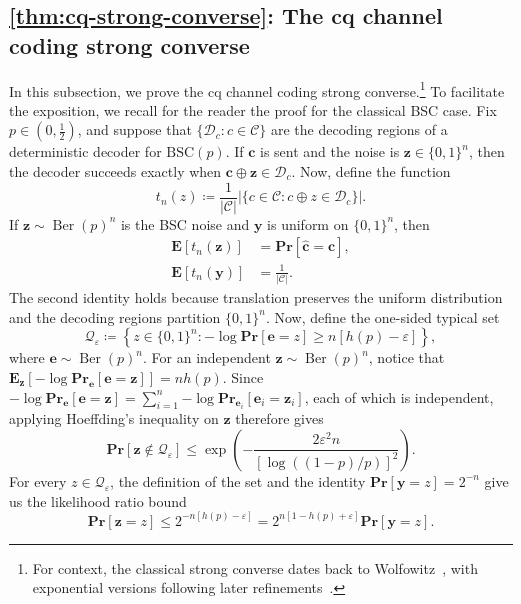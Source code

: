 \documentclass[11pt]{article}
\renewcommand{\leq}{\leqslant}
\renewcommand{\geq}{\geqslant}
\theoremstyle{remark}
\newcommand{\cC}{\mathcal{C}}
\newcommand{\cD}{\mathcal{D}}
\newcommand{\Ber}{\operatorname{Ber}}
\newcommand{\Eb}{\mathbf{E}}
\newcommand{\Prb}{\mathbf{Pr}}
\newcommand{\bits}{\{0,1\}}
\newcommand{\bchat}{\hat{\mathbf{c}}}
\newcommand{\bc}{\mathbf{c}}
\newcommand{\be}{\mathbf{e}}
\newcommand{\by}{\mathbf{y}}
\newcommand{\bz}{\mathbf{z}}
\newcommand{\eps}{\varepsilon}
\newcommand{\abs}[1]{\left|#1\right|}
\newcommand{\BSC}{\mathrm{BSC}}
\begin{document}
\subsection{\texorpdfstring{\cref{thm:cq-strong-converse}}{Theorem }: The cq channel coding strong converse}
\label{appsubsec:proof-fixed-channel-strong-converse}

In this subsection, we prove the cq channel coding strong converse.\footnote{For context, the classical strong converse dates back to Wolfowitz~\cite{Wol57}, with exponential versions following later refinements~\cite{Str64,Ari73}.} To facilitate the exposition, we recall for the reader the proof for the classical BSC case. Fix $p\in(0,\frac{1}{2})$, and suppose that $\{\cD_c : c \in \cC\}$ are the decoding regions of a deterministic decoder for $\BSC(p)$. If $\bc$ is sent and the noise is $\bz \in \bits^n$, then the decoder succeeds exactly when $\bc \oplus \bz \in \cD_c$. Now, define the function
\begin{equation*}
t_n(z)
\coloneqq
\frac{1}{\abs{\cC}}
\abs{\{c\in\cC:c\oplus z\in\cD_c\}}.
\end{equation*}
If $\bz\sim\Ber(p)^n$ is the BSC noise and $\by$ is uniform on $\bits^n$, then
\begin{align*}
\Eb[t_n(\bz)]
&=\Prb[\bchat=\bc], \\
\Eb[t_n(\by)]
&=\frac{1}{\abs{\cC}}.
\end{align*}
The second identity holds because translation preserves the uniform distribution and the decoding regions partition $\bits^n$. Now, define the one-sided typical set
\begin{equation*}
\mathcal{Q}_\eps
\coloneqq
\left\{z\in\bits^n:
-\log{\Prb[\be=z]}\geq n[h(p)-\eps]
\right\},
\end{equation*}
where $\be \sim \Ber(p)^n$. For an independent $\bz \sim \Ber(p)^n$, notice that $\Eb_\bz\left[-\log{\Prb_\be[\be = \bz]}\right] = nh(p)$. Since $-\log{\Prb_\be[\be = \bz]} = \sum_{i=1}^n{-\log{\Prb_{\be_i}[\be_i = \bz_i]}}$, each of which is independent, applying Hoeffding's inequality on $\bz$ therefore gives
\begin{equation*}
\Prb[\bz\notin\mathcal{Q}_\eps]
\leq
\exp\left(
-\frac{2\eps^2n}{[\log((1-p)/p)]^2}
\right).
\end{equation*}
For every $z\in\mathcal{Q}_\eps$, the definition of the set and the identity $\Prb[\by=z]=2^{-n}$ give us the likelihood ratio bound
\begin{equation*}
\Prb[\bz=z]
\leq
2^{-n[h(p)-\eps]}
=
2^{n[1-h(p)+\eps]}\Prb[\by=z].
\end{equation*}
\end{document}
